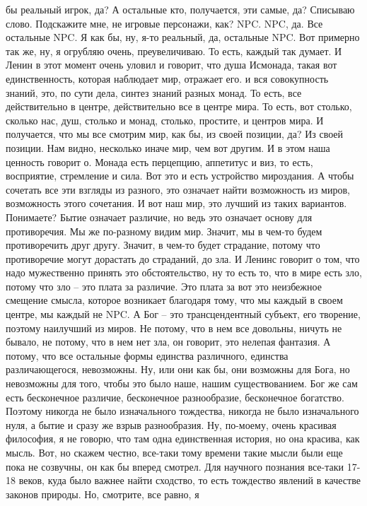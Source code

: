 бы реальный игрок, да? А остальные кто, получается, эти самые, да? Списываю
слово. Подскажите мне, не игровые персонажи, как? NPC. NPC, да. Все остальные
NPC. Я как бы, ну, я-то реальный, да, остальные NPC. Вот примерно так же, ну, я
огрубляю очень, преувеличиваю. То есть, каждый так думает. И Ленин в этот момент
очень уловил и говорит, что душа Исмонада, такая вот единственность, которая
наблюдает мир, отражает его. и вся совокупность знаний, это, по сути дела,
синтез знаний разных монад. То есть, все действительно в центре, действительно
все в центре мира. То есть, вот столько, сколько нас, душ, столько и монад,
столько, простите, и центров мира. И получается, что мы все смотрим мир, как бы,
из своей позиции, да? Из своей позиции. Нам видно, несколько иначе мир, чем вот
другим. И в этом наша ценность говорит о. Монада есть перцепцию, аппетитус и
виз, то есть, восприятие, стремление и сила. Вот это и есть устройство
мироздания. А чтобы сочетать все эти взгляды из разного, это означает найти
возможность из миров, возможность этого сочетания. И вот наш мир, это лучший из
таких вариантов. Понимаете? Бытие означает различие, но ведь это означает основу
для противоречия. Мы же по-разному видим мир. Значит, мы в чем-то будем
противоречить друг другу. Значит, в чем-то будет страдание, потому что
противоречие могут дорастать до страданий, до зла. И Ленинс говорит о том, что
надо мужественно принять это обстоятельство, ну то есть то, что в мире есть зло,
потому что зло – это плата за различие. Это плата за вот это неизбежное смещение
смысла, которое возникает благодаря тому, что мы каждый в своем центре, мы
каждый не NPC. А Бог – это трансцендентный субъект, его творение, поэтому
наилучший из миров. Не потому, что в нем все довольны, ничуть не бывало, не
потому, что в нем нет зла, он говорит, это нелепая фантазия. А потому, что все
остальные формы единства различного, единства различающегося, невозможны. Ну,
или они как бы, они возможны для Бога, но невозможны для того, чтобы это было
наше, нашим существованием. Бог же сам есть бесконечное различие, бесконечное
разнообразие, бесконечное богатство. Поэтому никогда не было изначального
тождества, никогда не было изначального нуля, а бытие и сразу же взрыв
разнообразия. Ну, по-моему, очень красивая философия, я не говорю, что там одна
единственная история, но она красива, как мысль. Вот, но скажем честно, все-таки
тому времени такие мысли были еще пока не созвучны, он как бы вперед смотрел.
Для научного познания все-таки 17-18 веков, куда было важнее найти сходство, то
есть тождество явлений в качестве законов природы. Но, смотрите, все равно, я
